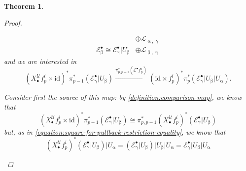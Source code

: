 \documentclass[11pt,fleqn]{article}
\theoremstyle{plain}
\newtheorem{theorem}{Theorem}[subsection]
\theoremstyle{definition}
\theoremstyle{remark}
\numberwithin{equation}{theorem}
\newcommand{\cover}{\mathcal{U}}
\newcommand{\restricted}{\mathbin{\big\vert}}
\newcommand{\id}{\mathrm{id}}
\newcommand{\nerve}[1]{X_{#1}^\cover}
\begin{document}
\begin{theorem}
\begin{proof}
\begin{enumerate}
\begin{enumerate}[(i)]
\begin{equation*}
\begin{array}{lr}
                                        &\oplus
                                        \mathcal{L}_{\upalpha,\upgamma}\\[0.3em]
                                        \mathcal{E}_\upbeta^\bullet
                                        \cong
                                        \mathcal{E}_\upgamma^\bullet \restricted U_\upbeta
                                        &\oplus
                                        \mathcal{L}_{\upbeta,\upgamma}
                                    \end{array}
                                \end{equation*}
                                and we are interested in
                                \begin{equation*}
                                    \left(\nerve{\bullet}f_p^i\times\id\right)^* \pi_{p-1}^* \left(\mathcal{E}_\upgamma^\bullet \restricted U_\upbeta\right)
                                    \xrightarrow{\pi_{p,p-1}^*\left(\mathcal{E}^\bullet f_p^i\right)}
                                    \left(\id\times f_p^i\right)^* \pi_p^* \left(\mathcal{E}_\upgamma^\bullet \restricted U_\upbeta \restricted U_\upalpha\right).
                                \end{equation*}

                                Consider first the source of this map: by \cref{definition:comparison-map}, we know that
                                \begin{equation*}
                                    \left(\nerve{\bullet}f_p^i\times\id\right)^* \pi_{p-1}^* \left(\mathcal{E}_\upgamma^\bullet \restricted U_\upbeta\right)
                                    \cong
                                    \pi_{p,p-1}^* \left(\nerve{\bullet}f_p^i\right)^* \left(\mathcal{E}_\upgamma^\bullet \restricted U_\upbeta\right)
                                \end{equation*}
                                but, as in \cref{equation:square-for-pullback-restriction-equality}, we know that
                                \begin{equation*}
                                    \left(\nerve{\bullet}f_p^i\right)^* \left(\mathcal{E}_\upgamma^\bullet \restricted U_\upbeta\right) \restricted U_\upalpha
                                    =
                                    \left(\mathcal{E}_\upgamma^\bullet \restricted U_\upbeta\right) \restricted U_\upbeta \restricted U_\upalpha
                                    =
                                    \mathcal{E}_\upgamma^\bullet \restricted U_\upbeta \restricted U_\upalpha
                                \end{equation*}


\end{enumerate}
\end{enumerate}
\end{proof}
\end{theorem}
\end{document}
